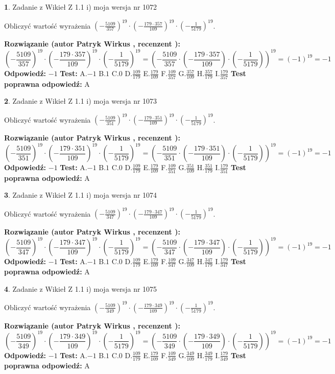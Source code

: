 \documentclass[12pt, a4paper]{article}
\theoremstyle{definition} %
\newtheorem{zad}{}
\newcommand{\zadStart}[1]{\begin{zad}#1\newline}
\newcommand{\zadStop}{\end{zad}}
\newcommand{\rozwStart}[2]{\noindent \textbf{Rozwiązanie (autor #1 , recenzent #2): }\newline}
\newcommand{\rozwStop}{\newline}
\newcommand{\odpStart}{\noindent \textbf{Odpowiedź:}\newline}
\newcommand{\odpStop}{\newline}
\newcommand{\testStart}{\noindent \textbf{Test:}\newline}
\newcommand{\testStop}{\newline}
\newcommand{\kluczStart}{\noindent \textbf{Test poprawna odpowiedź:}\newline}
\newcommand{\kluczStop}{\newline}
\begin{document}
\zadStart{Zadanie z Wikieł Z 1.1 i) moja wersja nr 1072}

Obliczyć wartość wyrażenia $(-\frac{5109}{357})^{19} \cdot (-\frac{179 \cdot 357}{109})^{19} \cdot (-\frac{1}{5179})^{19}$.
\zadStop
\rozwStart{Patryk Wirkus}{}
$$(-\frac{5109}{357})^{19} \cdot (-\frac{179 \cdot 357}{109})^{19} \cdot (-\frac{1}{5179})^{19} = (-\frac{5109}{357} \cdot (-\frac{179 \cdot 357}{109}) \cdot (-\frac{1}{5179}))^{19} = (-1)^{19} = -1$$
\rozwStop
\odpStart
$-1$
\odpStop
\testStart
A.$-1$ B.$1$ C.$0$ D.$\frac{109}{179}$ E.$\frac{179}{109}$
F.$\frac{109}{357}$ G.$\frac{357}{109}$
H.$\frac{357}{179}$
I.$\frac{179}{357}$
\testStop
\kluczStart
A
\kluczStop



\zadStart{Zadanie z Wikieł Z 1.1 i) moja wersja nr 1073}

Obliczyć wartość wyrażenia $(-\frac{5109}{351})^{19} \cdot (-\frac{179 \cdot 351}{109})^{19} \cdot (-\frac{1}{5179})^{19}$.
\zadStop
\rozwStart{Patryk Wirkus}{}
$$(-\frac{5109}{351})^{19} \cdot (-\frac{179 \cdot 351}{109})^{19} \cdot (-\frac{1}{5179})^{19} = (-\frac{5109}{351} \cdot (-\frac{179 \cdot 351}{109}) \cdot (-\frac{1}{5179}))^{19} = (-1)^{19} = -1$$
\rozwStop
\odpStart
$-1$
\odpStop
\testStart
A.$-1$ B.$1$ C.$0$ D.$\frac{109}{179}$ E.$\frac{179}{109}$
F.$\frac{109}{351}$ G.$\frac{351}{109}$
H.$\frac{351}{179}$
I.$\frac{179}{351}$
\testStop
\kluczStart
A
\kluczStop



\zadStart{Zadanie z Wikieł Z 1.1 i) moja wersja nr 1074}

Obliczyć wartość wyrażenia $(-\frac{5109}{347})^{19} \cdot (-\frac{179 \cdot 347}{109})^{19} \cdot (-\frac{1}{5179})^{19}$.
\zadStop
\rozwStart{Patryk Wirkus}{}
$$(-\frac{5109}{347})^{19} \cdot (-\frac{179 \cdot 347}{109})^{19} \cdot (-\frac{1}{5179})^{19} = (-\frac{5109}{347} \cdot (-\frac{179 \cdot 347}{109}) \cdot (-\frac{1}{5179}))^{19} = (-1)^{19} = -1$$
\rozwStop
\odpStart
$-1$
\odpStop
\testStart
A.$-1$ B.$1$ C.$0$ D.$\frac{109}{179}$ E.$\frac{179}{109}$
F.$\frac{109}{347}$ G.$\frac{347}{109}$
H.$\frac{347}{179}$
I.$\frac{179}{347}$
\testStop
\kluczStart
A
\kluczStop



\zadStart{Zadanie z Wikieł Z 1.1 i) moja wersja nr 1075}

Obliczyć wartość wyrażenia $(-\frac{5109}{349})^{19} \cdot (-\frac{179 \cdot 349}{109})^{19} \cdot (-\frac{1}{5179})^{19}$.
\zadStop
\rozwStart{Patryk Wirkus}{}
$$(-\frac{5109}{349})^{19} \cdot (-\frac{179 \cdot 349}{109})^{19} \cdot (-\frac{1}{5179})^{19} = (-\frac{5109}{349} \cdot (-\frac{179 \cdot 349}{109}) \cdot (-\frac{1}{5179}))^{19} = (-1)^{19} = -1$$
\rozwStop
\odpStart
$-1$
\odpStop
\testStart
A.$-1$ B.$1$ C.$0$ D.$\frac{109}{179}$ E.$\frac{179}{109}$
F.$\frac{109}{349}$ G.$\frac{349}{109}$
H.$\frac{349}{179}$
I.$\frac{179}{349}$
\testStop
\kluczStart
A
\kluczStop
\end{document}
